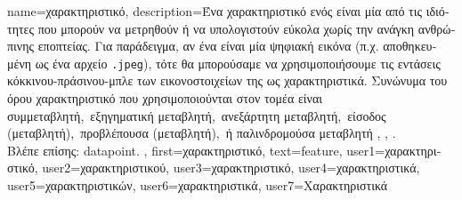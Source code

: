 {name={\foreignlanguage{greek}{χαρακτηριστικό}},
	description={\foreignlanguage{greek}{Ένα χαρακτηριστικό ενός} 
		 \foreignlanguage{greek}{είναι μία από τις ιδιότητες που μπορούν να μετρηθούν  
		ή να υπολογιστούν εύκολα χωρίς την ανάγκη ανθρώπινης εποπτείας. Για παράδειγμα, αν ένα}  
		\foreignlanguage{greek}{είναι μία ψηφιακή εικόνα (π.χ. αποθηκευμένη ως ένα αρχείο} \texttt{.jpeg}), 
		\foreignlanguage{greek}{τότε θα μπορούσαμε να χρησιμοποιήσουμε τις εντάσεις κόκκινου-πράσινου-μπλε  
		των εικονοστοιχείων της ως χαρακτηριστικά. Συνώνυμα του όρου χαρακτηριστικό που χρησιμοποιούνται στον τομέα είναι 
		\guillemotleft συμμεταβλητή,\guillemotright\ \guillemotleft εξηγηματική μεταβλητή,\guillemotright\ 
		\guillemotleft ανεξάρτητη μεταβλητή,\guillemotright\ \guillemotleft είσοδος (μεταβλητή),\guillemotright\ 
		\guillemotleft προβλέπουσα (μεταβλητή),\guillemotright\ ή 
		\guillemotleft παλινδρομούσα μεταβλητή\guillemotright} \cite{Gujarati2021}, \cite{Dodge2003}, \cite{Everitt2022}.\\
		\foreignlanguage{greek}{Βλέπε επίσης:} \gls{datapoint}. }, 
	first={\foreignlanguage{greek}{χαρακτηριστικό}},
	text={feature},
	user1={\foreignlanguage{greek}{χαρακτηριστικό}}, %
	user2={\foreignlanguage{greek}{χαρακτηριστικού}}, %
	user3={\foreignlanguage{greek}{χαρακτηριστικό}}, %
	user4={\foreignlanguage{greek}{χαρακτηριστικά}}, %
	user5={\foreignlanguage{greek}{χαρακτηριστικών}}, %
	user6={\foreignlanguage{greek}{χαρακτηριστικά}}, %
	user7={\foreignlanguage{greek}{Χαρακτηριστικά}} %
}

